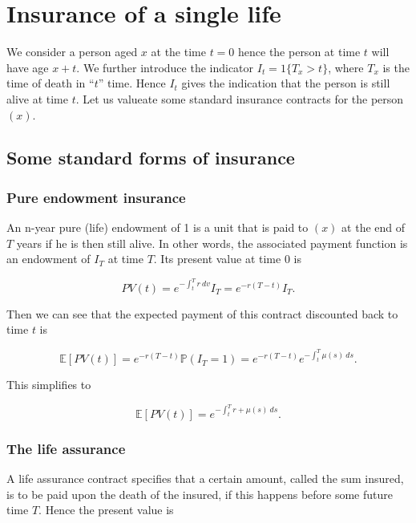 \documentclass[a4paper,10pt,openany]{book}
\begin{document}
\hypertarget{insurance-of-a-single-life}{%
\section{Insurance of a single life}\label{insurance-of-a-single-life}}

We consider a person aged \(x\) at the time \(t=0\) hence the person at time \(t\) will have age \(x+t\). We further introduce the indicator \(I_t=1\{T_x>t\}\), where \(T_x\) is the time of death in ``\(t\)'' time. Hence \(I_t\) gives the indication that the person is still alive at time \(t\). Let us valueate some standard insurance contracts for the person \((x)\).

\hypertarget{some-standard-forms-of-insurance}{%
\subsection{Some standard forms of insurance}\label{some-standard-forms-of-insurance}}

\hypertarget{pure-endowment-insurance}{%
\subsubsection{Pure endowment insurance}\label{pure-endowment-insurance}}

An n-year pure (life) endowment of 1 is a unit that is paid to \((x)\) at the end of \(T\) years if he is then still alive. In other words, the associated payment function is an endowment of \(I_T\) at time \(T\). Its present value at time 0 is

\[
PV(t)=e^{-\int_t^T r\ dv}I_T=e^{-r(T-t)}I_T.
\]

Then we can see that the expected payment of this contract discounted back to time \(t\) is

\[
\mathbb E[PV(t)]=e^{-r(T-t)}\mathbb P(I_T=1)=e^{-r(T-t)}e^{-\int_t^T\mu(s)\ ds}.
\]

This simplifies to

\[
\mathbb E[PV(t)]=e^{-\int_t^Tr+\mu(s)\ ds}.
\]

\hypertarget{the-life-assurance}{%
\subsubsection{The life assurance}\label{the-life-assurance}}

A life assurance contract specifies that a certain amount, called the sum insured, is to be paid upon the death of the insured, if this happens before some future time \(T\). Hence the present value is
\end{document}
